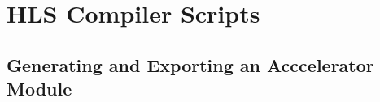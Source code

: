 \chapter{HLS Compiler Scripts}

\section{Generating and Exporting an Acccelerator Module}
\label{apx:script-hls}


